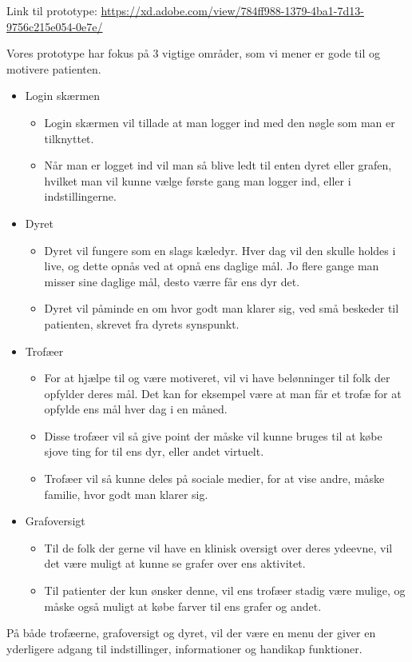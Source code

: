 Link til prototype: \url{https://xd.adobe.com/view/784ff988-1379-4ba1-7d13-9756c215e054-0e7e/}

Vores prototype har fokus på 3 vigtige områder, som vi mener er gode til og motivere patienten. \\

\begin{itemize}
	\item Login skærmen
	\begin{itemize}
		\item Login skærmen vil tillade at man logger ind med den nøgle som man er tilknyttet.
		\item Når man er logget ind vil man så blive ledt til enten dyret eller grafen, hvilket man vil kunne vælge første gang man logger ind, eller i indstillingerne.
	\end{itemize}
	\item Dyret
	\begin{itemize}
		\item Dyret vil fungere som en slags kæledyr. Hver dag vil den skulle holdes i live, og dette opnås ved at opnå ens daglige mål. Jo flere gange man misser sine daglige mål, desto værre får ens dyr det.
		\item Dyret vil påminde en om hvor godt man klarer sig, ved små beskeder til patienten, skrevet fra dyrets synspunkt.
	\end{itemize}
	\item Trofæer
	\begin{itemize}
		\item For at hjælpe til og være motiveret, vil vi have belønninger til folk der opfylder deres mål. Det kan for eksempel være at man får et trofæ for at opfylde ens mål hver dag i en måned.
		\item Disse trofæer vil så give point der måske vil kunne bruges til at købe sjove ting for til ens dyr, eller andet virtuelt.
		\item Trofæer vil så kunne deles på sociale medier, for at vise andre, måske familie, hvor godt man klarer sig.
	\end{itemize}
	\item Grafoversigt
	\begin{itemize}
		\item Til de folk der gerne vil have en klinisk oversigt over deres ydeevne, vil det være muligt at kunne se grafer over ens aktivitet.
		\item Til patienter der kun ønsker denne, vil ens trofæer stadig være mulige, og måske også muligt at købe farver til ens grafer og andet.
	\end{itemize}
\end{itemize}

På både trofæerne, grafoversigt og dyret, vil der være en menu der giver en yderligere adgang til indstillinger, informationer og handikap funktioner.
